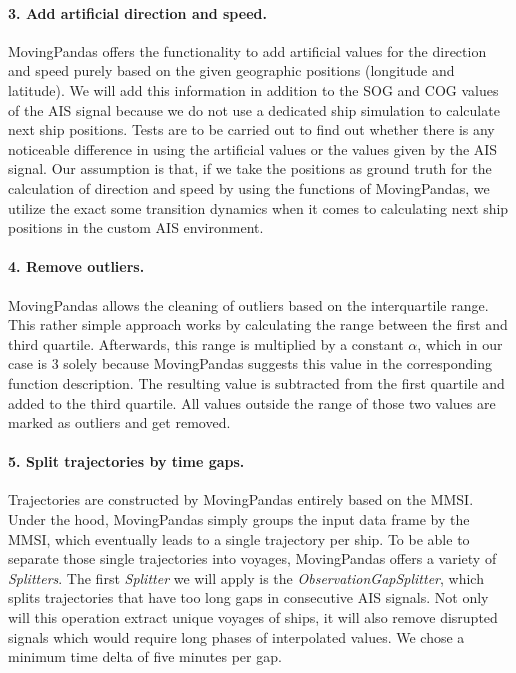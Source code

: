 \paragraph{3. Add artificial direction and speed.}
MovingPandas offers the functionality to add artificial values for the direction and speed purely based on the given geographic positions (longitude and latitude). We will add this information in addition to the SOG and COG values of the AIS signal because we do not use a dedicated ship simulation to calculate next ship positions. Tests are to be carried out to find out whether there is any noticeable difference in using the artificial values or the values given by the AIS signal. Our assumption is that, if we take the positions as ground truth for the calculation of direction and speed by using the functions of MovingPandas, we utilize the exact some transition dynamics when it comes to calculating next ship positions in the custom AIS environment.

\paragraph{4. Remove outliers.}
MovingPandas allows the cleaning of outliers based on the interquartile range. This rather simple approach works by calculating the range between the first and third quartile. Afterwards, this range is multiplied by a constant $\alpha$, which in our case is $3$ solely because MovingPandas suggests this value in the corresponding function description. The resulting value is subtracted from the first quartile and added to the third quartile. All values outside the range of those two values are marked as outliers and get removed.

\paragraph{5. Split trajectories by time gaps.}
Trajectories are constructed by MovingPandas entirely based on the MMSI. Under the hood, MovingPandas simply groups the input data frame by the MMSI, which eventually leads to a single trajectory per ship. To be able to separate those single trajectories into voyages, MovingPandas offers a variety of \textit{Splitters}. The first \textit{Splitter} we will apply is the \textit{ObservationGapSplitter}, which splits trajectories that have too long gaps in consecutive AIS signals. Not only will this operation extract unique voyages of ships, it will also remove disrupted signals which would require long phases of interpolated values.
We chose a minimum time delta of five minutes per gap.

